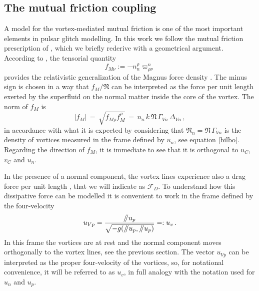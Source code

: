 \documentclass[usenatbib%
]{mnras}
\newcommand{\paral}{\mathbin{ \, \!/\mkern-5mu/\!} \,}
\begin{document}
\subsection{The mutual friction coupling}\label{sec:The mutual friction coupling}

A model for the vortex-mediated mutual friction is one of the most important elements in pulsar glitch modelling.
In this work we follow the mutual friction prescription of \cite{langlois98}, which we briefly 
rederive with a geometrical argument.
According to \cite{langlois98}, the tensorial quantity
\begin{equation}\label{cretaceo}
f_{M\nu} := - n_n^\rho \varpi^n_{\rho \nu}
\end{equation}
provides the relativistic generalization of the Magnus force density \citep[see also ][]{Carter_Prix_Magnus, Andersson_Mutual_Friction_2016}.
The minus sign is chosen in a way that $f_M/\mathfrak{N}$ can be interpreted as the force per unit length exerted by the superfluid on the normal matter inside the core of the vortex. The norm of $f_M$ is
\begin{equation}\label{normando}
|f_M| \,= \, \sqrt{f_{M\rho} f_{M}^\rho  } \, = \, n_n \, k \, \mathfrak{N} \, \Gamma_{Vn} \, \Delta_{Vn} \, ,
\end{equation}
in accordance  with what it is expected by considering that  $\mathfrak{N}_n = \mathfrak{N} \, \Gamma_{Vn}$ is the density of vortices measured in the frame defined by $u_n$, see equation \eqref{bilbo}. 
Regarding the direction of $f_{M }$, it is immediate to see that it is orthogonal to $u_C$, $v_C$ and $u_n$.

In the presence of a normal component,  the vortex lines experience also a drag force per unit length \citep{Dbook1991}, that we will indicate as $\mathcal{F}_D$. To understand how this dissipative force can be modelled it is convenient to work in the frame 
defined by the four-velocity
\begin{equation}
u_{Vp} = \dfrac{\paral u_p}{\sqrt{-g(\paral u_p,\paral u_p)}} =: u_v \, .
\end{equation}
In this frame the vortices are at rest and the normal component moves orthogonally to the vortex lines, see the previous section. The vector $u_{Vp}$ can be interpreted as the proper four-velocity of the vortices, so, for notational convenience, it will be referred to as $u_v$, in full analogy with the notation used for $u_n$ and $u_p$. 
\end{document}
